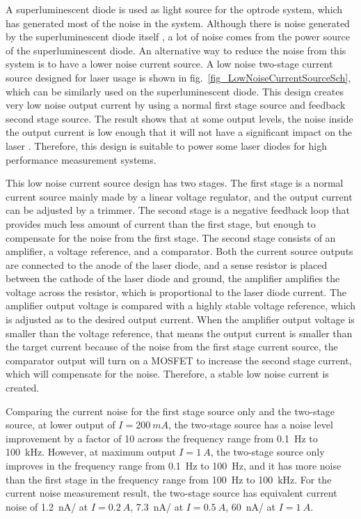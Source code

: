 A superluminescent diode is used as light source for the optrode system, which has generated most of the noise in the system.  Although there is noise generated by the superluminescent diode itself \cite{SLDNoise}, a lot of noise comes from the power source of the superluminescent diode.  An alternative way to reduce the noise from this system is to have a lower noise current source.  A low noise two-stage current source designed for laser usage \cite{LowNoiseCurrentSource} is shown in fig.~\ref{fig_LowNoiseCurrentSourceSch}, which can be similarly used on the superluminescent diode.  This design creates very low noise output current by using a normal first stage source and feedback second stage source.  The result shows that at some output levels, the noise inside the output current is low enough that it will not have a significant impact on the laser \cite{LinewidthQuantumCascadeLaser}.  Therefore, this design is suitable to power some laser diodes for high performance measurement systems.

This low noise current source design has two stages.  The first stage is a normal current source mainly made by a linear voltage regulator, and the output current can be adjusted by a trimmer.  The second stage is a negative feedback loop that provides much less amount of current than the first stage, but enough to compensate for the noise from the first stage.  The second stage consists of an amplifier, a voltage reference, and a comparator.  Both the current source outputs are connected to the anode of the laser diode, and a sense resistor is placed between the cathode of the laser diode and ground, the amplifier amplifies the voltage across the resistor, which is proportional to the laser diode current.  The amplifier output voltage is compared with a highly stable voltage reference, which is adjusted as to the desired output current.  When the amplifier output voltage is smaller than the voltage reference, that means the output current is smaller than the target current because of the noise from the first stage current source, the comparator output will turn on a MOSFET to increase the second stage current, which will compensate for the noise.  Therefore, a stable low noise current is created.

Comparing the current noise for the first stage source only and the two-stage source, at lower output of $I = \qty{200}{mA}$, the two-stage source has a noise level improvement by a factor of 10 across the frequency range from \qty{0.1}{Hz} to \qty{100}{kHz}.  However, at maximum output $I = \qty{1}{A}$, the two-stage source only improves in the frequency range from \qty{0.1}{Hz} to \qty{100}{Hz}, and it has more noise than the first stage in the frequency range from \qty{100}{Hz} to \qty{100}{kHz}.
For the current noise measurement result, the two-stage source has equivalent current noise of \qty{1.2}{nA/\sqrthz} at $I = \qty{0.2}{A}$, \qty{7.3}{nA/\sqrthz} at $I = \qty{0.5}{A}$, \qty{60}{nA/\sqrthz} at $I = \qty{1}{A}$.

